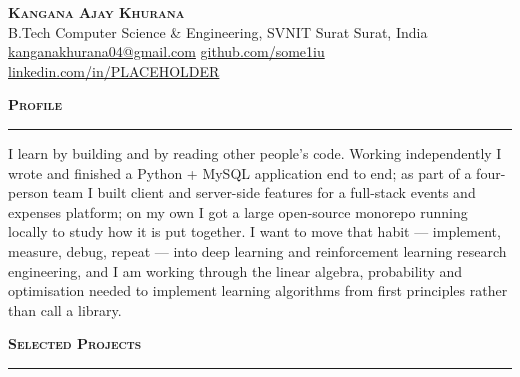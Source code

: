 \documentclass[10pt,a4paper]{article}
\newcommand{\cvsection}[1]{%
  \par\vspace{7pt}%
  {\fontsize{11}{13}\selectfont\bfseries\scshape\color{accent}#1\par}%
  \vspace{1.5pt}%
  {\color{rulegray}\rule{\textwidth}{0.55pt}\par}%
  \vspace{2.5pt}%
}
\begin{document}
\begin{center}
  {\fontsize{20}{22}\selectfont\bfseries\scshape\color{accent} Kangana Ajay Khurana}\\[2pt]
  {\small B.Tech Computer Science \& Engineering, SVNIT Surat \;\textbullet\; Surat, India}\\[1pt]
  {\small
    \href{mailto:kanganakhurana04@gmail.com}{kanganakhurana04@gmail.com} \;\textbar\;
    \href{https://github.com/some1iu}{github.com/some1iu} \;\textbar\;
    \href{https://www.linkedin.com/in/PLACEHOLDER}{linkedin.com/in/PLACEHOLDER} \;\textbar{}
  }
\end{center}

\cvsection{Profile}
I learn by building and by reading other people's code. Working independently I wrote and finished a
Python + MySQL application end to end; as part of a four-person team I built client and server-side
features for a full-stack events and expenses platform; on my own I got a large open-source monorepo
running locally to study how it is put together. I want to move that habit --- implement, measure,
debug, repeat --- into deep learning and reinforcement learning research engineering, and I am
working through the linear algebra, probability and optimisation needed to implement learning
algorithms from first principles rather than call a library.

\cvsection{Selected Projects}
\end{document}
